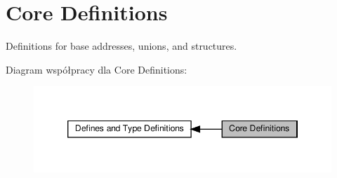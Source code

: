 \hypertarget{group___c_m_s_i_s__core__base}{}\section{Core Definitions}
\label{group___c_m_s_i_s__core__base}


Definitions for base addresses, unions, and structures.  


Diagram współpracy dla Core Definitions\+:\nopagebreak
\begin{figure}[H]
\begin{center}
\leavevmode
\includegraphics[width=346pt]{group___c_m_s_i_s__core__base}
\end{center}
\end{figure}

